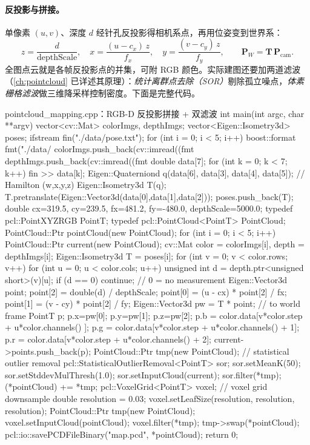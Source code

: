 \paragraph{反投影与拼接。}
单像素 $(u,v)$、深度 $d$ 经针孔反投影得相机系点，再用位姿变到世界系：
\begin{equation}
  z=\frac{d}{\text{depthScale}},\quad x=\frac{(u-c_x)\,z}{f_x},\quad y=\frac{(v-c_y)\,z}{f_y},\qquad
  \mathbf{P}_W=\mathbf{T}\,\mathbf{P}_{\mathrm{cam}}.
  \label{eq:dense-rgbd-backproj}
\end{equation}
全图点云就是各帧反投影点的并集，可附 RGB 颜色。实际建图还要加两道滤波（\cref{ch:pointcloud} 已详述其原理）：\emph{统计离群点去除（SOR）}剔除孤立噪点，\emph{体素栅格滤波}做三维降采样控制密度。下面是完整代码。

\begin{codebox}[C++]{pointcloud\_mapping.cpp：RGB-D 反投影拼接 + 双滤波}
int main(int argc, char **argv) {
  vector<cv::Mat> colorImgs, depthImgs;
  vector<Eigen::Isometry3d> poses;
  ifstream fin("./data/pose.txt");
  for (int i = 0; i < 5; i++) {
    boost::format fmt("./data/%
    colorImgs.push_back(cv::imread((fmt %
    depthImgs.push_back(cv::imread((fmt %
    double data[7]; for (int k = 0; k < 7; k++) fin >> data[k];
    Eigen::Quaterniond q(data[6], data[3], data[4], data[5]); // Hamilton (w,x,y,z)
    Eigen::Isometry3d T(q); T.pretranslate(Eigen::Vector3d(data[0],data[1],data[2]));
    poses.push_back(T);
  }
  double cx=319.5, cy=239.5, fx=481.2, fy=-480.0, depthScale=5000.0;
  typedef pcl::PointXYZRGB PointT;
  typedef pcl::PointCloud<PointT> PointCloud;
  PointCloud::Ptr pointCloud(new PointCloud);
  for (int i = 0; i < 5; i++) {
    PointCloud::Ptr current(new PointCloud);
    cv::Mat color = colorImgs[i], depth = depthImgs[i];
    Eigen::Isometry3d T = poses[i];
    for (int v = 0; v < color.rows; v++)
    for (int u = 0; u < color.cols; u++) {
      unsigned int d = depth.ptr<unsigned short>(v)[u];
      if (d == 0) continue;                          // 0 = no measurement
      Eigen::Vector3d point;
      point[2] = double(d) / depthScale;
      point[0] = (u - cx) * point[2] / fx;
      point[1] = (v - cy) * point[2] / fy;
      Eigen::Vector3d pw = T * point;                // to world frame
      PointT p; p.x=pw[0]; p.y=pw[1]; p.z=pw[2];
      p.b = color.data[v*color.step + u*color.channels()    ];
      p.g = color.data[v*color.step + u*color.channels() + 1];
      p.r = color.data[v*color.step + u*color.channels() + 2];
      current->points.push_back(p);
    }
    PointCloud::Ptr tmp(new PointCloud);             // statistical outlier removal
    pcl::StatisticalOutlierRemoval<PointT> sor;
    sor.setMeanK(50); sor.setStddevMulThresh(1.0);
    sor.setInputCloud(current); sor.filter(*tmp);
    (*pointCloud) += *tmp;
  }
  pcl::VoxelGrid<PointT> voxel;                       // voxel grid downsample
  double resolution = 0.03;
  voxel.setLeafSize(resolution, resolution, resolution);
  PointCloud::Ptr tmp(new PointCloud);
  voxel.setInputCloud(pointCloud); voxel.filter(*tmp);
  tmp->swap(*pointCloud);
  pcl::io::savePCDFileBinary("map.pcd", *pointCloud);
  return 0;
}
\end{codebox}

